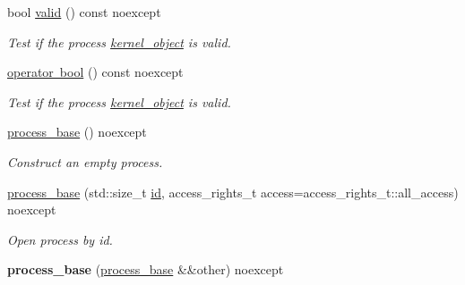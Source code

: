\begin{DoxyCompactItemize}
bool \mbox{\hyperlink{classdistant_1_1kernel__objects_1_1process__base_a6299b49ad8fb1c22e54dc9aa6c3a09b2}{valid}} () const noexcept
\begin{DoxyCompactList}\small\item\em Test if the process \mbox{\hyperlink{classdistant_1_1kernel__objects_1_1kernel__object}{kernel\+\_\+object}} is valid. \end{DoxyCompactList}\item 
\mbox{\hyperlink{classdistant_1_1kernel__objects_1_1process__base_a0d69c4e7d61551e7246eed5dcaabc6d9}{operator bool}} () const noexcept
\begin{DoxyCompactList}\small\item\em Test if the process \mbox{\hyperlink{classdistant_1_1kernel__objects_1_1kernel__object}{kernel\+\_\+object}} is valid. \end{DoxyCompactList}\item 
\mbox{\label{classdistant_1_1kernel__objects_1_1process__base_ad5aa6b7591af9560bf164b5ae75a295c}} 
\mbox{\hyperlink{classdistant_1_1kernel__objects_1_1process__base_ad5aa6b7591af9560bf164b5ae75a295c}{process\+\_\+base}} () noexcept
\begin{DoxyCompactList}\small\item\em Construct an empty process. \end{DoxyCompactList}\item 
\mbox{\hyperlink{classdistant_1_1kernel__objects_1_1process__base_a845358a2126f878a2777acf7d855b79b}{process\+\_\+base}} (std\+::size\+\_\+t \mbox{\hyperlink{classdistant_1_1kernel__objects_1_1process__base_a553b90767de864164d807075f67c1402}{id}}, access\+\_\+rights\+\_\+t access=access\+\_\+rights\+\_\+t\+::all\+\_\+access) noexcept
\begin{DoxyCompactList}\small\item\em Open process by id. \end{DoxyCompactList}\item 
\mbox{\label{classdistant_1_1kernel__objects_1_1process__base_a77b9fe42db8ee2b364cf6e56f369867b}} 
{\bfseries process\+\_\+base} (\mbox{\hyperlink{classdistant_1_1kernel__objects_1_1process__base}{process\+\_\+base}} \&\&other) noexcept
\item 
\mbox{\label{classdistant_1_1kernel__objects_1_1process__base_a449fa10bee50a4091db59a6550479598}} 

\end{DoxyCompactItemize}
